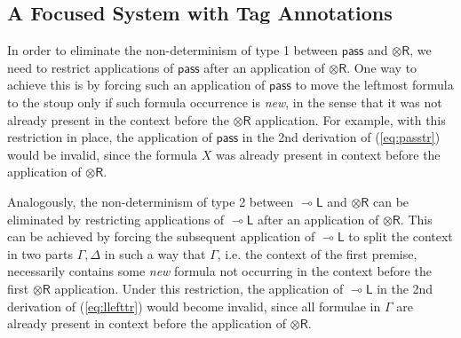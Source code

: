 \documentclass[copyright,creativecommons]{eptcs}
\theoremstyle{definition}
\newcommand{\tr}{\otimes \mathsf{R}}
\newcommand{\lright}{{\multimap}\mathsf{R}}
\newcommand{\lleft}{{\multimap}\mathsf{L}}
\newcommand{\pass}{\mathsf{pass}}
\newcommand{\ax}{\mathsf{ax}}
\newcommand{\ot}{\otimes}
\newcommand{\lolli}{\multimap}
\newcommand{\RI}{\mathsf{RI}}
\newcommand{\LI}{\mathsf{LI}}
\newcommand{\Pass}{\mathsf{P}}
\newcommand{\F}{\mathsf{F}}
\begin{document}

\subsection{A Focused System with Tag Annotations}\label{sec:tag}

In order to eliminate the non-determinism of type 1 between $\pass$ and $\tr$, we need to restrict applications of $\pass$ after an application of $\tr$. 
One way to achieve this is by forcing such an application of $\pass$ to move the leftmost formula to the stoup only if such formula occurrence is \emph{new}, in the sense that it was not already present in the context before the $\tr$ application. For example, with this restriction in place, the application of $\pass$ in the 2nd derivation of (\ref{eq:passtr}) would be invalid, since the formula $X$ was already present in context before the application of $\tr$.

Analogously, the non-determinism of type 2 between $\lleft$ and $\tr$ can be eliminated by restricting applications of $\lleft$ after an application of $\tr$. This can be achieved by forcing the subsequent application of $\lleft$ to split the context in two parts $\Gamma,\Delta$ in such a way that $\Gamma$, i.e. the context of the first premise, necessarily contains some \emph{new} formula not occurring in the context before the first $\tr$ application. Under this restriction, the application of $\lleft$ in the 2nd derivation of (\ref{eq:llefttr}) would become invalid, since all formulae in $\Gamma$ are already present in context before the application of $\tr$.
\end{document}
